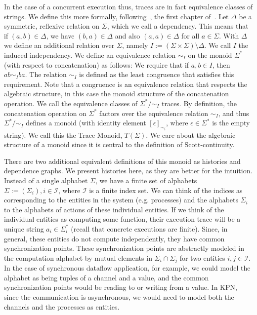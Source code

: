 In the case of a concurrent execution thus, traces are in fact equivalence classes of strings.
We define this more formally, following~\cite{mazurkiewicz1995introduction}, the first chapter of~\cite{diekert1995book}.
Let $\Delta$ be a symmetric, reflexive relation on $\Sigma$, which we call a dependency.
This means that if $(a,b) \in \Delta$, we have $(b,a) \in \Delta$ and also $(a,a) \in \Delta$ for all $a \in \Sigma$. 
With $\Delta$ we define an additional relation over $\Sigma$, namely $I := (\Sigma \times \Sigma) \setminus \Delta$.
We call $I$ the induced independency. 
We define an equivalence relation $\sim_I$ on the monoid $\Sigma^*$ (with respect to concatenation) as follows:
We require that if $a,b \in I$, then $ab \sim_I ba$.
The relation $\sim_I$ is defined as the least congruence that satisfies this requirement.
Note that a congruence is an equivalence relation that respects the algebraic structure, in this case the monoid structure of the concatenation operation.
We call the equivalence classes of $\Sigma^*/{\sim_I}$ traces. 
By definition, the concatenation operation on $\Sigma^*$ factors over the equivalence relation $\sim_I$,
and thus $\Sigma^*/{\sim_I}$ defines a monoid (with identity element $[\epsilon]_{\sim_i}$, where $\epsilon \in \Sigma^*$ is the empty string).
We call this the Trace Monoid, $T(\Sigma)$.
We care about the algebraic structure of a monoid since it is central to the definition of Scott-continuity.


There are two additional equivalent definitions of this monoid as histories and dependence graphs.
We present histories here, as they are better for the intuition.
Instead of a single alphabet $\Sigma$, we have a finite set of alphabets $\Sigma := (\Sigma_i), i \in \mathcal{I}$, where $\mathcal{I}$ is a finite index set.
We can think of the indices as corresponding to the entities in the system (e.g. processes) and the alphabets $\Sigma_i$ to the alphabets of actions of these individual entities.
If we think of the individual entities as computing some function, their execution trace will be a unique string $a_i \in \Sigma_i^*$ (recall that concrete executions are finite).
Since, in general, these entities do not compute independently, they have common synchronization points.
These synchronization points are abstractly modeled in the computation alphabet by mutual elements in $\Sigma_i \cap \Sigma_j$ for two entities $i,j \in \mathcal{I}$.
In the case of synchronous dataflow application, for example, we could model the alphabet as being tuples of a channel and a value, and the common synchronization points would be reading to or writing from a value.
In \ac{KPN}, since the communication is asynchronous, we would need to model both the channels and the processes as entities.

